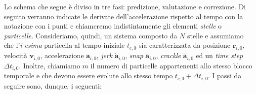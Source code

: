 Lo schema che segue è diviso in tre fasi: predizione, valutazione e correzione. Di seguito verranno indicate le derivate dell'accelerazione rispetto al tempo con la notazione con i punti e chiameremo indistintamente gli elementi \textit{stelle} o \textit{particelle}. Consideriamo, quindi, un sistema composto da $N$ stelle e assumiamo che l'\textit{i-esima} particella al tempo iniziale $t_{c,0}$ sia caratterizzata da posizione $\textbf{r}_{i,0}$, velocità $\textbf{v}_{i,0}$, accelerazione $\textbf{a}_{i,0}$, \textit{jerk} $\dot{\mathbf{a}}_{i, 0}$, \textit{snap} $\ddot{\mathbf{a}}_{i, 0}$, \textit{crackle} $\dddot{\mathbf{a}}_{i, 0}$ ed un \textit{time step} $\Delta t_{i,0}$. Inoltre, chiamiamo $m$ il numero
di particelle appartenenti allo stesso blocco temporale e che devono essere evolute allo stesso tempo $t_{c,0} + \Delta t_{i,0}$. I passi da seguire sono, dunque, i seguenti:
